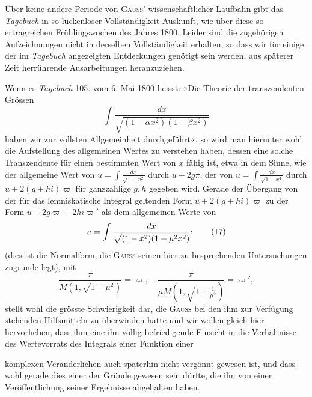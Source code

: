 \par\medskip
\begin{center}\end{center}
\noindent\hspace*{\parindent}Über keine andere Periode von \textsc{Gauss'} wissenschaftlicher Laufbahn gibt
das \textit{Tagebuch} in so lückenloser Vollständigkeit Auskunft, wie über diese so
ertragreichen Frühlingswochen des Jahres 1800. Leider sind die zugehörigen
Aufzeichnungen nicht in derselben Vollständigkeit erhalten, so dass wir für
einige der im \textit{Tagebuch} angezeigten Entdeckungen genötigt sein werden, aus
späterer Zeit herrührende Ausarbeitungen heranzuziehen.

Wenn es \textit{Tagebuch} 105. vom 6. Mai 1800 heisst: »Die Theorie der transzendenten Grössen
\[
\int\frac{dx}{\sqrt{(1-\alpha x^2)(1-\beta x^2)}}
\]
\noindent haben wir zur vollsten Allgemeinheit durchgeführt«, so wird man hierunter
wohl die Aufstellung des allgemeinen Wertes zu verstehen haben, dessen
eine solche Transzendente für einen bestimmten Wert von \(x\) fähig ist, etwa
in dem Sinne, wie der allgemeine Wert von \(u=\int\frac{dx}{\sqrt{1-x^2}}\) durch \(u+2g\pi\),
der von \(u=\int\frac{dx}{\sqrt{1-x^4}}\) durch \(u+2(g+hi)\varpi\) für ganzzahlige \(g,h\) gegeben wird.
Gerade der Übergang von der für das lemniskatische Integral geltenden Form
\(u+2(g+hi)\varpi\) zu der Form \(u+2g\varpi+2hi\varpi'\) als dem allgemeinen Werte von
\begingroup\makeatletter\tagsleft@true\let\veqno\leqno\makeatother
\begin{equation*}
u=\int\frac{dx}{\sqrt{(1-x^2)(1+\mu^2x^2)}}\mathpunct{\vcenter{\hbox{,}}}\tag{17}
\end{equation*}
\endgroup
\noindent (dies ist die Normalform, die \textsc{Gauss} seinen hier zu besprechenden Untersuchungen zugrunde legt), mit
\begingroup\makeatletter\tagsleft@true\let\veqno\leqno\makeatother
\begin{equation*}
\frac{\pi}{M(1,\sqrt{1+\mu^2})}=\varpi,\quad
\frac{\pi}{\mu M\left(1,\sqrt{1+\frac1{\mu^2}}\right)}=\varpi',\tag{18}
\end{equation*}
\endgroup
\noindent stellt wohl die grösste Schwierigkeit dar, die \textsc{Gauss} bei den ihm zur Verfügung stehenden Hilfsmitteln zu überwinden hatte und wir wollen gleich
hier hervorheben, dass ihm eine ihn völlig befriedigende Einsicht in die Verhältnisse des Wertevorrats des Integrals einer  Funktion einer\par
\clearpage{}
\noindent komplexen Veränderlichen auch späterhin nicht vergönnt gewesen ist, und
dass wohl gerade dies einer der Gründe gewesen sein dürfte, die ihn von
einer Veröffentlichung seiner Ergebnisse abgehalten haben.

